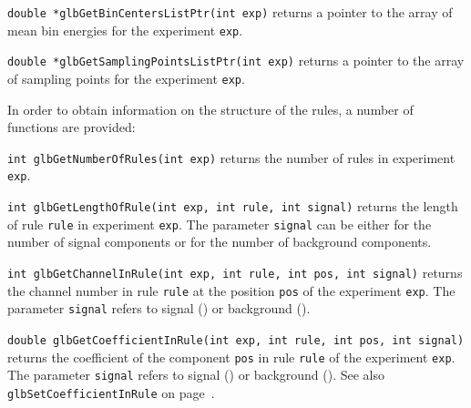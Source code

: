 \begin{function}
{\tt double *glbGetBinCentersListPtr(int exp)} returns a pointer to the array of
mean bin energies for the experiment {\tt exp}.
\end{function}
\begin{function}
{\tt double *glbGetSamplingPointsListPtr(int exp)} returns a pointer to the array of
sampling points for the experiment {\tt exp}.
\end{function}

In order to obtain information on the structure of the rules, 
a number of functions are provided:
\begin{function}
{\tt int glbGetNumberOfRules(int exp)} returns the number of
rules in experiment {\tt exp}.
\end{function}
\begin{function}
{\tt int glbGetLengthOfRule(int exp, int rule, int signal)} returns
the length of rule {\tt rule} in experiment {\tt exp}. The parameter
{\tt signal} can be either  for the number of signal
components or  for the number of background components.
\end{function}
%
\begin{function}
{\tt int glbGetChannelInRule(int exp, int rule, int pos, int signal)}
returns the channel number in rule {\tt rule} at the position {\tt pos}
of the experiment {\tt exp}.
The parameter {\tt signal} refers to signal () or background
().
\end{function}
\begin{function}
 \label{glbGetCoefficientInRule}
{\tt double glbGetCoefficientInRule(int exp, int rule, int pos, int signal)}
returns the coefficient of the component {\tt pos} in rule {\tt rule} 
of the experiment {\tt exp}.
The parameter {\tt signal} refers to signal () or background
(). See also {\tt glbSetCoefficientInRule} on page~\pageref{glbSetCoefficientInRule}.
\end{function}

